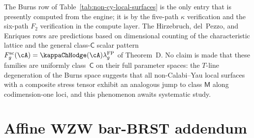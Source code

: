 \begin{remark}
\label{rem:non-cy-scope}
The Burns row of Table~\ref{tab:non-cy-local-surfaces} is the only
entry that is presently computed from the engine; it is
\ClaimStatusProvedElsewhere{} by the five-path $\kappa$ verification
and the six-path $F_2$ verification in the compute layer. The
Hirzebruch, del~Pezzo, and Enriques rows are
\ClaimStatusConjectured{} predictions based on dimensional counting
of the characteristic lattice and the general class-$\mathsf{C}$
scalar pattern
\(F_g^{\mathrm{sc}}(\cA)
=\kappaChHodge(\cA)\lambda_g^{\mathrm{FP}}\) of Theorem~D.
No claim is made that these families are uniformly class~$\mathsf{C}$
on their full parameter spaces: the $T$-line degeneration of the
Burns space suggests that all non-Calabi--Yau local surfaces with a
composite stress tensor exhibit an analogous jump to class
$\mathsf{M}$ along codimension-one loci, and this phenomenon
awaits systematic study.
\end{remark}

\section{Affine WZW bar-BRST addendum}

